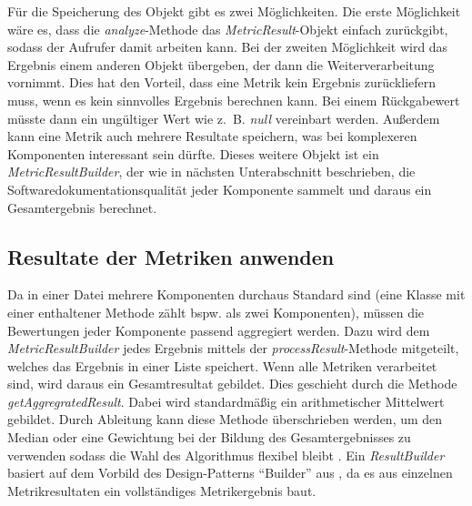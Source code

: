 Für die Speicherung des Objekt gibt es zwei Möglichkeiten. Die erste Möglichkeit wäre es, dass die \textit{analyze}-Methode das \textit{MetricResult}-Objekt einfach zurückgibt, sodass der Aufrufer damit arbeiten kann. Bei der zweiten Möglichkeit wird das Ergebnis einem anderen Objekt übergeben, der dann die Weiterverarbeitung vornimmt. Dies hat den Vorteil, dass eine Metrik kein Ergebnis zurückliefern muss, wenn es kein sinnvolles Ergebnis berechnen kann. Bei einem Rückgabewert müsste dann ein ungültiger Wert wie z.~B. \textit{null} vereinbart werden. Außerdem kann eine Metrik auch mehrere Resultate speichern, was bei komplexeren Komponenten interessant sein dürfte. Dieses weitere Objekt ist ein  \textit{MetricResultBuilder}, der wie in nächsten Unterabschnitt beschrieben, die Softwaredokumentationsqualität jeder Komponente sammelt und daraus ein Gesamtergebnis berechnet.  
\subsection{Resultate der Metriken anwenden}
Da in einer Datei mehrere Komponenten durchaus Standard sind (eine Klasse mit einer enthaltener Methode zählt bspw. als zwei Komponenten), müssen die Bewertungen jeder Komponente passend aggregiert werden. Dazu wird dem \textit{MetricResultBuilder} jedes Ergebnis mittels der \textit{processResult}-Methode mitgeteilt, welches das Ergebnis in einer Liste speichert. Wenn alle Metriken verarbeitet sind, wird daraus ein Gesamtresultat gebildet. Dies geschieht durch die Methode \textit{getAggregratedResult}. Dabei wird standardmäßig ein arithmetischer Mittelwert gebildet. Durch Ableitung kann diese Methode überschrieben werden, um den Median oder eine Gewichtung bei der Bildung des Gesamtergebnisses zu verwenden  sodass die Wahl des Algorithmus flexibel bleibt . Ein \textit{ResultBuilder} basiert auf dem Vorbild des Design-Patterns \enquote{Builder} aus \cite[S.139-149]{gamma2015design}, da es aus einzelnen Metrikresultaten ein vollständiges Metrikergebnis baut.

